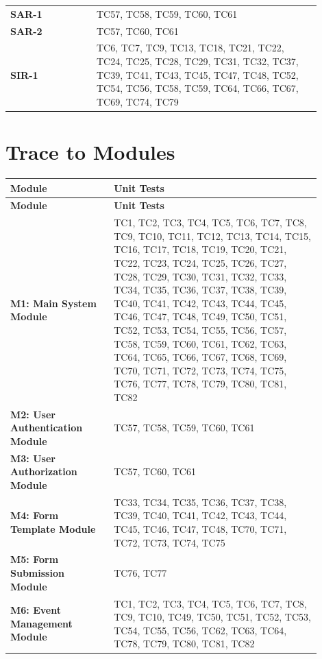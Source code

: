 \documentclass[12pt, titlepage]{article}
\begin{document}
\begin{longtable}{p{0.25\linewidth} p{0.65\linewidth}}
\textbf{SAR-1} & TC57, TC58, TC59, TC60, TC61 \\[4mm]
\textbf{SAR-2} & TC57, TC60, TC61 \\[4mm]
\textbf{SIR-1} & TC6, TC7, TC9, TC13, TC18, TC21, TC22, TC24, TC25, TC28, TC29, TC31,
                  TC32, TC37, TC39, TC41, TC43, TC45, TC47, TC48, TC52, TC54, TC56,
                  TC58, TC59, TC64, TC66, TC67, TC69, TC74, TC79 \\[4mm]

\end{longtable}
\section{Trace to Modules}
\begin{longtable}{p{0.30\linewidth} p{0.60\linewidth}}
\toprule
\textbf{Module} & \textbf{Unit Tests} \\
\midrule
\endfirsthead
\toprule
\textbf{Module} & \textbf{Unit Tests} \\
\midrule
\endhead
\bottomrule
\endfoot

\textbf{M1: Main System Module}
  & TC1, TC2, TC3, TC4, TC5, TC6, TC7, TC8, TC9, TC10,
    TC11, TC12, TC13, TC14, TC15, TC16, TC17, TC18, TC19,
    TC20, TC21, TC22, TC23, TC24, TC25, TC26, TC27, TC28,
    TC29, TC30, TC31, TC32, TC33, TC34, TC35, TC36, TC37,
    TC38, TC39, TC40, TC41, TC42, TC43, TC44, TC45, TC46,
    TC47, TC48, TC49, TC50, TC51, TC52, TC53, TC54, TC55,
    TC56, TC57, TC58, TC59, TC60, TC61, TC62, TC63, TC64,
    TC65, TC66, TC67, TC68, TC69, TC70, TC71, TC72, TC73,
    TC74, TC75, TC76, TC77, TC78, TC79, TC80, TC81, TC82 \\[4mm]

\textbf{M2: User Authentication Module}
  & TC57, TC58, TC59, TC60, TC61 \\[4mm]

\textbf{M3: User Authorization Module}
  & TC57, TC60, TC61 \\[4mm]

\textbf{M4: Form Template Module}
  & TC33, TC34, TC35, TC36, TC37, TC38, TC39, TC40, TC41,
    TC42, TC43, TC44, TC45, TC46, TC47, TC48,
    TC70, TC71, TC72, TC73, TC74, TC75 \\[4mm]

\textbf{M5: Form Submission Module}
  & TC76, TC77 \\[4mm]

\textbf{M6: Event Management Module}
  & TC1, TC2, TC3, TC4, TC5, TC6, TC7, TC8, TC9, TC10,
    TC49, TC50, TC51, TC52, TC53, TC54, TC55, TC56,
    TC62, TC63, TC64,
    TC78, TC79, TC80, TC81, TC82 \\[4mm]



\end{longtable}
\end{document}
